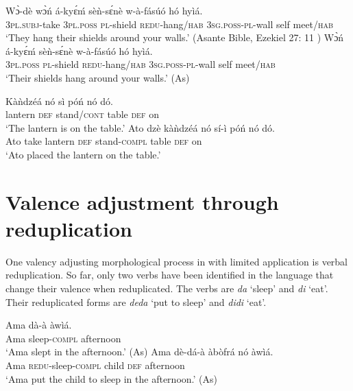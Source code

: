 \documentclass[output=paper]{langsci/langscibook}
\begin{document}
\ea\label{ex:45.osam}
\ea\label{ex:45a.osam}
\gll   Wɔ̀-dè    wɔ̀ń    á-ky\'{ɛ}ḿ   sèǹ-s\'{ɛ}nè w-à-fásúó    hó   hyìá. \\
       \textsc{3pl.subj}-take  \textsc{3pl.poss}  \textsc{pl}-shield  \textsc{redu}-hang/\textsc{hab} \textsc{3sg.poss-pl}-wall  self  meet/\textsc{hab}  \\
\glt `They hang their shields around your walls.' (Asante Bible, Ezekiel 27: 11 \citep{bible1964})
\ex\label{ex:45b.osam}
\gll   Wɔ̀ń    á-ky\'{ɛ}ḿ    sèǹ-s\'{ɛ}nè     w-à-fásúó hó  hyìá.\\
       \textsc{3pl.poss}  \textsc{pl}-shield  \textsc{redu}-hang/\textsc{hab}  \textsc{3sg.poss-pl}-wall self  meet/\textsc{hab}\\
\glt `Their shields hang around your walls.' (As)
\z 
\z 

\ea\label{ex:46.osam}
\ea\label{ex:46a.osam}
\gll Kàǹdzéá  nó  sì    póń  nó  dó.\\
       lantern    \textsc{def}  stand/\textsc{cont}  table  \textsc{def}  on\\
\glt `The lantern is on the table.'
\ex\label{ex:46b.osam}
\gll   Ato  dzè  kàǹdzéá  nó  sí-ì    póń  nó  dó.\\
       Ato  take  lantern    \textsc{def}  stand-\textsc{compl}  table  \textsc{def}  on\\
\glt `Ato placed the lantern on the table.'
\z 
\z 


\section{Valence adjustment through reduplication}\label{§6:valence.osam}

One valency adjusting morphological process in  with limited application is verbal reduplication. So far, only two verbs have been identified in the language that change their valence when reduplicated. The verbs are \textit{da} `sleep' and \textit{di} `eat'. Their reduplicated forms are \textit{deda} `put to sleep' and \textit{didi} `eat'.

\ea\label{ex:47.osam}
\ea\label{ex:47a.osam}
\gll  Ama  dà-à    àwìá.\\
       Ama  sleep-\textsc{compl}  afternoon\\
\glt   `Ama slept in the afternoon.' (As)
\ex\label{ex:47b.osam}
\gll   Ama  dè-dá-à    àbòfrá    nó  àwìá.\\
       Ama  \textsc{redu}-sleep\textsc{-compl}  child    \textsc{def}  afternoon\\
\glt   `Ama put the child to sleep in the afternoon.' (As)
\z 
\z 
\end{document}
